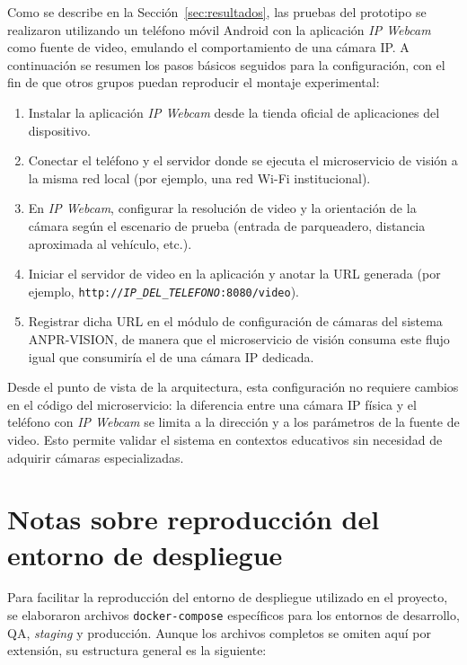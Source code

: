 Como se describe en la Sección~\ref{sec:resultados}, las pruebas del
prototipo se realizaron utilizando un teléfono móvil Android con la
aplicación \textit{IP Webcam} como fuente de video, emulando el comportamiento
de una cámara IP. A continuación se resumen los pasos básicos seguidos para
la configuración, con el fin de que otros grupos puedan reproducir el
montaje experimental:

\begin{enumerate}
    \item Instalar la aplicación \textit{IP Webcam} desde la tienda oficial de aplicaciones del dispositivo.
    \item Conectar el teléfono y el servidor donde se ejecuta el microservicio de visión a la misma red local (por ejemplo, una red Wi-Fi institucional).
    \item En \textit{IP Webcam}, configurar la resolución de video y la orientación de la cámara según el escenario de prueba (entrada de parqueadero, distancia aproximada al vehículo, etc.).
    \item Iniciar el servidor de video en la aplicación y anotar la URL generada (por ejemplo, \texttt{http://\textit{IP\_DEL\_TELEFONO}:8080/video}).
    \item Registrar dicha URL en el módulo de configuración de cámaras del sistema ANPR-VISION, de manera que el microservicio de visión consuma este flujo igual que consumiría el de una cámara IP dedicada.
\end{enumerate}

Desde el punto de vista de la arquitectura, esta configuración no requiere
cambios en el código del microservicio: la diferencia entre una cámara IP
física y el teléfono con \textit{IP Webcam} se limita a la dirección y a los
parámetros de la fuente de video. Esto permite validar el sistema en contextos
educativos sin necesidad de adquirir cámaras especializadas.

\section{Notas sobre reproducción del entorno de despliegue}
\label{ap:reproduccion_entorno}

Para facilitar la reproducción del entorno de despliegue utilizado en el
proyecto, se elaboraron archivos \texttt{docker-compose} específicos para los
entornos de desarrollo, QA, \textit{staging} y producción. Aunque los
archivos completos se omiten aquí por extensión, su estructura general es la
siguiente:

